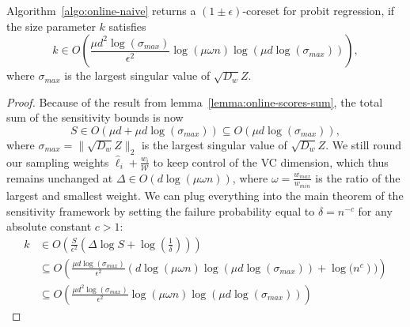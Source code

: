 \begin{theorem}
    Algorithm~\ref{algo:online-naive} returns a $(1 \pm \epsilon)$-coreset
    for probit regression, if the size parameter $k$ satisfies
    \begin{equation*}
        k \in O\left(\frac{\mu d^2 \log(\sigma_{max})}{\epsilon^2}\log(\mu \omega n) \log(\mu d \log(\sigma_{max}))\right),
    \end{equation*}
    where $\sigma_{max}$ is the largest singular value of $\sqrt{D_w}Z$.
\end{theorem}
\begin{proof}
    Because of the result from lemma~\ref{lemma:online-scores-sum},
    the total sum of the sensitivity bounds is
    now
    \begin{equation*}
        S \in O(\mu d + \mu d \log(\sigma_{max}))
        \subseteq O(\mu d \log(\sigma_{max})),
    \end{equation*}
    where $\sigma_{max} = \lVert \sqrt{D_w}Z \rVert_2$ is
    the largest singular value of $\sqrt{D_w}Z$.
    We still round our sampling weights
    $\hat{\ell}_i + \frac{w_i}{\mathcal{W}}$ to keep control of the
    VC dimension, which thus remains unchanged at
    $\Delta \in O(d\log(\mu\omega n))$, where
    $\omega = \frac{w_{max}}{w_{min}}$ is the ratio of the
    largest and smallest weight.
    We can plug everything into the main theorem of the sensitivity
    framework by setting the failure probability equal to
    $\delta = n^{-c}$ for any absolute constant $c > 1$:
    \begin{align*}
        k & \in O\left( \frac{S}{\epsilon^2} \left(\Delta \log S + \log\left(\frac{1}{\delta}\right)\right)\right)                 \\
          & \subseteq O\left(\frac{\mu d \log(\sigma_{max}) }
            {\epsilon^2}\left(d \log(\mu \omega n) \log(\mu d \log(\sigma_{max})) +
            \log(n^c\right))\right)                                                                                                \\
          & \subseteq O\left(\frac{\mu d^2 \log(\sigma_{max})}{\epsilon^2}\log(\mu \omega n) \log(\mu d \log(\sigma_{max}))\right)
    \end{align*}
\end{proof}

